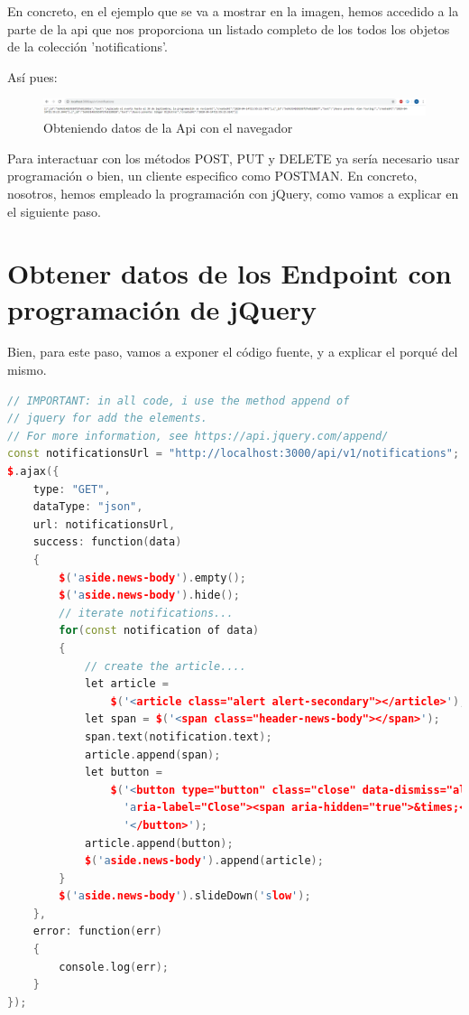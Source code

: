 \documentclass{article}
\begin{document}
En concreto, en el ejemplo que se va a mostrar en la imagen, hemos accedido a la parte de la api que nos proporciona un listado completo de los todos los objetos de la colección 'notifications'.

Así pues:

\begin{figure}[H]
\centering
\includegraphics[width=\textwidth]{api/get_data_api}
\caption{Obteniendo datos de la Api con el navegador}
\label{fig:universe}
\end{figure}

Para interactuar con los métodos POST, PUT y DELETE ya sería necesario usar programación o bien, un cliente especifico como POSTMAN. En concreto, nosotros, hemos empleado la programación con jQuery, como vamos a explicar en el siguiente paso.

\section{Obtener datos de los Endpoint con programación de jQuery}
Bien, para este paso, vamos a exponer el código fuente, y a explicar el porqué del mismo.

\begin{lstlisting}[language=C++]
// IMPORTANT: in all code, i use the method append of
// jquery for add the elements.
// For more information, see https://api.jquery.com/append/
const notificationsUrl = "http://localhost:3000/api/v1/notifications";
$.ajax({
    type: "GET",
    dataType: "json",
    url: notificationsUrl,
    success: function(data)
    {
        $('aside.news-body').empty();
        $('aside.news-body').hide();
        // iterate notifications...
        for(const notification of data)
        {
            // create the article....
            let article = 
                $('<article class="alert alert-secondary"></article>');
            let span = $('<span class="header-news-body"></span>');
            span.text(notification.text);
            article.append(span);
            let button = 
                $('<button type="button" class="close" data-dismiss="alert"' + 
                  'aria-label="Close"><span aria-hidden="true">&times;</span>' +
                  '</button>');
            article.append(button);
            $('aside.news-body').append(article);
        }
        $('aside.news-body').slideDown('slow');
    },
    error: function(err)
    {
        console.log(err);
    }
});
\end{lstlisting}
\end{document}
